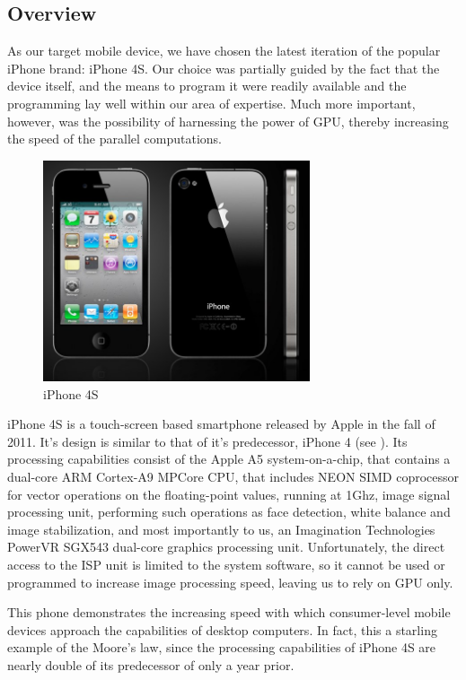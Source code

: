 \subsection{Overview}
As our target mobile device, we have chosen the latest iteration of the popular iPhone brand: iPhone 4S. Our choice was partially guided by the fact that the device itself, and the means to program it were readily available and the programming lay well within our area of expertise. Much more important, however, was the possibility of harnessing the power of GPU, thereby increasing the speed of the parallel computations.
\begin{figure}[t]
		\centering
		\includegraphics[width=0.7\textwidth]{iphone4s}
		\caption{iPhone 4S}
		\label{iph}
	\end{figure}
iPhone 4S is a touch-screen based smartphone released by Apple in the fall of 2011. It's design is similar to that of it's predecessor, iPhone 4 (see ). Its processing capabilities consist of the Apple A5 system-on-a-chip, that contains a dual-core ARM Cortex-A9 MPCore CPU, that includes NEON SIMD coprocessor for vector operations on the floating-point values, running at 1Ghz, image signal processing unit, performing such operations as face detection, white balance and image stabilization, and most importantly to us, an Imagination Technologies PowerVR SGX543 dual-core  graphics processing unit. Unfortunately,  the direct access to the ISP unit is limited to the system software, so it cannot be used or programmed to increase image processing speed, leaving us to rely on GPU only.

This phone demonstrates the increasing speed with which consumer-level mobile devices approach the capabilities of desktop computers. In fact, this a starling example of the Moore's law, since the processing capabilities of iPhone 4S are nearly double of its predecessor of only a year prior.

